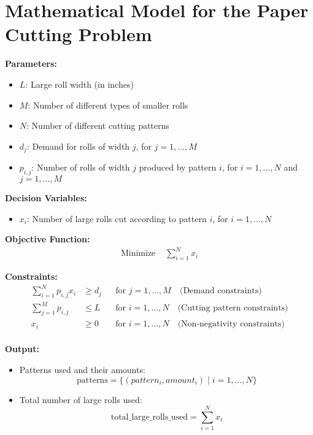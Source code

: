 \documentclass{article}
\begin{document}
\section*{Mathematical Model for the Paper Cutting Problem}

\textbf{Parameters:}
\begin{itemize}
    \item $L$: Large roll width (in inches)
    \item $M$: Number of different types of smaller rolls
    \item $N$: Number of different cutting patterns
    \item $d_j$: Demand for rolls of width $j$, for $j = 1, \ldots, M$
    \item $p_{i,j}$: Number of rolls of width $j$ produced by pattern $i$, for $i = 1, \ldots, N$ and $j = 1, \ldots, M$
\end{itemize}

\textbf{Decision Variables:}
\begin{itemize}
    \item $x_i$: Number of large rolls cut according to pattern $i$, for $i = 1, \ldots, N$
\end{itemize}

\textbf{Objective Function:}
\begin{align*}
    \text{Minimize } & \sum_{i=1}^{N} x_i
\end{align*}

\textbf{Constraints:}
\begin{align*}
    \sum_{i=1}^{N} p_{i,j} x_i & \geq d_j && \text{for } j = 1, \ldots, M \quad \text{(Demand constraints)} \\
    \sum_{j=1}^{M} p_{i,j} & \leq L && \text{for } i = 1, \ldots, N \quad \text{(Cutting pattern constraints)} \\
    x_i & \geq 0 && \text{for } i = 1, \ldots, N \quad \text{(Non-negativity constraints)} \\
\end{align*}

\textbf{Output:}
\begin{itemize}
    \item Patterns used and their amounts: 
    \[
    \text{patterns} = \{ (pattern_i, amount_i) \mid i = 1, \ldots, N \}
    \]
    \item Total number of large rolls used:
    \[
    \text{total\_large\_rolls\_used} = \sum_{i=1}^{N} x_i
    \]
\end{itemize}
\end{document}
